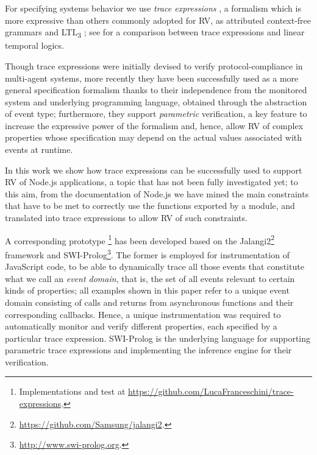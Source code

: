 For specifying systems behavior we use \emph{trace expressions} \cite{ancona2016comparing}, a formalism which is more expressive than others
commonly adopted for RV, as
attributed context-free grammars \cite{de2014combining} and LTL\textsubscript{3} \cite{ltl3}; see \cite{AnconaFM16} for a comparison between trace expressions and linear temporal logics.

Though trace expressions were initially devised to verify protocol-compliance in multi-agent systems, more recently they have been successfully
used as a more general specification formalism \cite{ParametricJava17, TowardsIoT17} thanks to their independence from the monitored system and underlying programming language, obtained through the abstraction of event type;
furthermore, they support \emph{parametric} verification, a key feature to increase the expressive power of the formalism and, hence, allow RV of complex properties whose specification may depend on the actual values associated with events at runtime.

In this work we show how trace expressions can be successfully used to support RV of Node.js applications, a topic that has not
been fully investigated yet;  to this aim, from the documentation of Node.js we have mined the main constraints that have
to be met to correctly use the functions exported by a module, and translated into trace expressions to allow RV of
such constraints. 

A corresponding prototype
\footnote{Implementations and test at \url{https://github.com/LucaFranceschini/trace-expressions}.}
has been developed based on the Jalangi2\footnote{\url{https://github.com/Samsung/jalangi2}.}
framework and SWI-Prolog\footnote{\url{http://www.swi-prolog.org}.}.
The former is employed for instrumentation of JavaScript code, to be able
to dynamically trace all those events that constitute what we call an \emph{event domain}, that is, the set
of all events relevant to certain kinds of properties;
all examples shown in this paper refer to a unique event domain consisting of calls and returns
from asynchronous functions and their corresponding callbacks. Hence, a unique instrumentation
was required to automatically monitor and verify different properties, each specified by a particular trace expression.
SWI-Prolog is the underlying language for supporting parametric
trace expressions and implementing the inference engine for their verification. 

